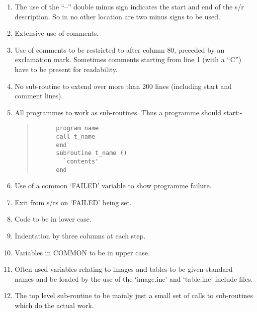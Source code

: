 \begin{enumerate}
\item The use of the ``--'' double minus sign indicates the start and
      end of the s/r description. So in no other location are two
      minus signs to be used.

\item Extensive use of comments.

\item Use of comments to be restricted to after column 80, preceded
      by an exclamation mark. Sometimes comments starting from
      line 1 (with a ``C'') have to be present for readability.

\item No sub-routine to extend over more than 200 lines (including
      start and comment lines).

\item All programmes to work as sub-routines. Thus a programme should
      start:-

\begin{quote}
\begin{tabbing}
\verb#      program name           # \\
\verb#      call t_name            # \\
\verb#      end                    # \\
\verb#      subroutine t_name ()   # \\
\verb#        `contents'           # \\
\verb#      end                    # \\
\end{tabbing}
\end{quote}

\item Use of a common `FAILED' variable to show programme failure.

\item Exit from s/rs on `FAILED' being set.

\item Code to be in lower case.

\item Indentation by three columns at each step.

\item Variables in COMMON to be in upper case.

\item Often used variables relating to images and tables to
      be given standard names and be loaded by the use
      of the `image.inc' and `table.inc' include files.

\item The top level sub-routine to be mainly just a small set of
      calls to sub-routines which do the actual work.

\end{enumerate}

